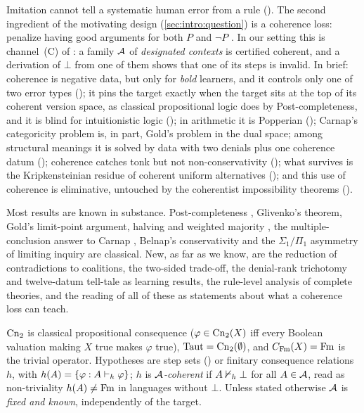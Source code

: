 Imitation cannot tell a systematic human error from a rule (). The second ingredient of the motivating design (\cref{sec:intro:question}) is a coherence loss: penalize having good arguments for both $P$ and $\neg P$ \citep{hanni2026notes}. In our setting this is channel~(C) of : a family $\mathcal{A}$ of \emph{designated contexts} is certified coherent, and a derivation of $\bot$ from one of them shows that one of its steps is invalid. In brief: coherence is negative data, but only for \emph{bold} learners, and it controls only one of two error types (); it pins the target exactly when the target sits at the top of its coherent version space, as classical propositional logic does by Post-completeness, and it is blind for intuitionistic logic (); in arithmetic it is Popperian (); Carnap's categoricity problem is, in part, Gold's problem in the dual space; among structural meanings it is solved by data with two denials plus one coherence datum (); coherence catches tonk but not non-conservativity (); what survives is the Kripkensteinian residue of coherent uniform alternatives (); and this use of coherence is eliminative, untouched by the coherentist impossibility theorems ().

Most results are known in substance. Post-completeness \citep{post1921,wojcicki1988theory}, Glivenko's theorem, Gold's limit-point argument, halving and weighted majority \citep{littlestone1988learning,littlestone1994weighted}, the multiple-conclusion answer to Carnap \citep{carnap1943formalization,shoesmith1978multiple}, Belnap's conservativity \citep{belnap1962tonk} and the $\Sigma_1/\Pi_1$ asymmetry of limiting inquiry \citep{putnam1965trial,gold1965limiting,kelly1996logic} are classical. New, as far as we know, are the reduction of contradictions to coalitions, the two-sided trade-off, the denial-rank trichotomy and twelve-datum tell-tale as learning results, the rule-level analysis of complete theories, and the reading of all of these as statements about what a coherence loss can teach.

$\mathrm{Cn}_2$ is classical propositional consequence ($\varphi\in\mathrm{Cn}_2(X)$ iff every Boolean valuation making $X$ true makes $\varphi$ true), $\mathrm{Taut}=\mathrm{Cn}_2(\emptyset)$, and $C_{\mathrm{Fm}}(X)=\mathrm{Fm}$ is the trivial operator. Hypotheses are step sets () or finitary consequence relations $h$, with $h(A)=\{\varphi:A\vdash_h\varphi\}$; $h$ is \emph{$\mathcal{A}$-coherent} if $A\nvdash_h\bot$ for all $A\in\mathcal{A}$, read as non-triviality $h(A)\neq\mathrm{Fm}$ in languages without $\bot$. Unless stated otherwise $\mathcal{A}$ is \emph{fixed and known}, independently of the target.

